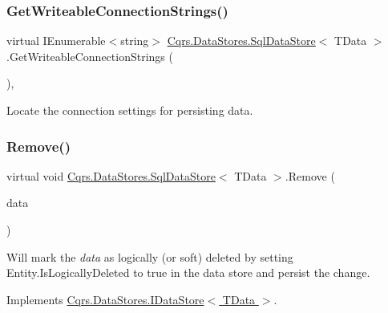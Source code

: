 \subsubsection{\texorpdfstring{Get\+Writeable\+Connection\+Strings()}{GetWriteableConnectionStrings()}}
{\footnotesize\ttfamily virtual I\+Enumerable$<$string$>$ \hyperlink{classCqrs_1_1DataStores_1_1SqlDataStore}{Cqrs.\+Data\+Stores.\+Sql\+Data\+Store}$<$ T\+Data $>$.Get\+Writeable\+Connection\+Strings (\begin{DoxyParamCaption}{ }\end{DoxyParamCaption})\hspace{0.3cm}{\ttfamily [protected]}, {\ttfamily [virtual]}}



Locate the connection settings for persisting data. 

\mbox{\label{classCqrs_1_1DataStores_1_1SqlDataStore_a898d15db199f054865a96ac646bf54fb_a898d15db199f054865a96ac646bf54fb}} 
\subsubsection{\texorpdfstring{Remove()}{Remove()}}
{\footnotesize\ttfamily virtual void \hyperlink{classCqrs_1_1DataStores_1_1SqlDataStore}{Cqrs.\+Data\+Stores.\+Sql\+Data\+Store}$<$ T\+Data $>$.Remove (\begin{DoxyParamCaption}\item[{T\+Data}]{data }\end{DoxyParamCaption})\hspace{0.3cm}{\ttfamily [virtual]}}



Will mark the {\itshape data}  as logically (or soft) deleted by setting Entity.\+Is\+Logically\+Deleted to true in the data store and persist the change. 



Implements \hyperlink{interfaceCqrs_1_1DataStores_1_1IDataStore_a7ef540796bbe4257296841590bc23478_a7ef540796bbe4257296841590bc23478}{Cqrs.\+Data\+Stores.\+I\+Data\+Store$<$ T\+Data $>$}.

\mbox{\label{classCqrs_1_1DataStores_1_1SqlDataStore_abb88337dccf3d5372f6b0920d5d26ebd_abb88337dccf3d5372f6b0920d5d26ebd}} 
